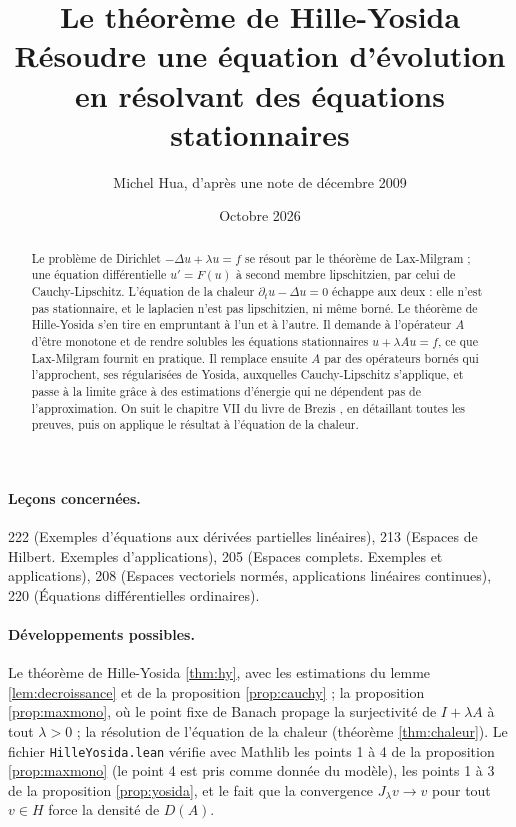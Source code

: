 \documentclass[11pt,a4paper]{article}
\title{Le théorème de Hille-Yosida\\[2pt]
\large Résoudre une équation d'évolution en résolvant des équations stationnaires}
\author{Michel Hua, d'après une note de décembre 2009}
\date{Octobre 2026}
\theoremstyle{plain}
\theoremstyle{definition}
\theoremstyle{remark}
\begin{document}
\maketitle

\begin{abstract}
Le problème de Dirichlet $-\Delta u+\lambda u=f$ se résout par le théorème de Lax-Milgram ; une équation différentielle $u'=F(u)$ à second membre lipschitzien, par celui de Cauchy-Lipschitz. L'équation de la chaleur $\partial_tu-\Delta u=0$ échappe aux deux : elle n'est pas stationnaire, et le laplacien n'est pas lipschitzien, ni même borné. Le théorème de Hille-Yosida s'en tire en empruntant à l'un et à l'autre. Il demande à l'opérateur $A$ d'être monotone et de rendre solubles les équations stationnaires $u+\lambda Au=f$, ce que Lax-Milgram fournit en pratique. Il remplace ensuite $A$ par des opérateurs bornés qui l'approchent, ses régularisées de Yosida, auxquelles Cauchy-Lipschitz s'applique, et passe à la limite grâce à des estimations d'énergie qui ne dépendent pas de l'approximation. On suit le chapitre VII du livre de Brezis \cite{brezis}, en détaillant toutes les preuves, puis on applique le résultat à l'équation de la chaleur.
\end{abstract}

\paragraph{Leçons concernées.} 222 (Exemples d'équations aux dérivées partielles linéaires), 213 (Espaces de Hilbert. Exemples d'applications), 205 (Espaces complets. Exemples et applications), 208 (Espaces vectoriels normés, applications linéaires continues), 220 (Équations différentielles ordinaires).

\paragraph{Développements possibles.} Le théorème de Hille-Yosida \ref{thm:hy}, avec les estimations du lemme \ref{lem:decroissance} et de la proposition \ref{prop:cauchy} ; la proposition \ref{prop:maxmono}, où le point fixe de Banach propage la surjectivité de $I+\lambda A$ à tout $\lambda>0$ ; la résolution de l'équation de la chaleur (théorème \ref{thm:chaleur}). Le fichier \texttt{HilleYosida.lean} vérifie avec Mathlib les points 1 à 4 de la proposition \ref{prop:maxmono} (le point 4 est pris comme donnée du modèle), les points 1 à 3 de la proposition \ref{prop:yosida}, et le fait que la convergence $J_\lambda v\to v$ pour tout $v\in H$ force la densité de $D(A)$.
\end{document}
